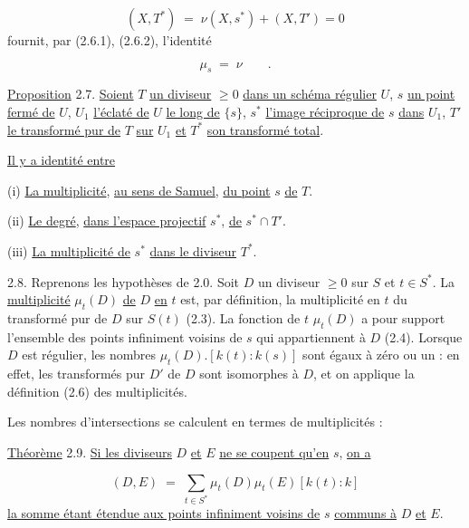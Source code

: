 \begin{equation*}
(X,T^*) \;=\; \nu(X,s^*) + (X,T') = 0
\end{equation*}
fournit, par (2.6.1), (2.6.2), l'identité

\begin{equation}\tag{2.6.3}
\mu_s \;=\; \nu \qquad .
\end{equation}


\underline{Proposition} 2.7. \underline{Soient} $T$ \underline{un diviseur} $\geq 0$ \underline{dans un schéma régulier} $U$, $s$ \underline{un point fermé de} $U$, $U_1$ \underline{l'éclaté de} $U$ \underline{le long de} $\{s\}$, $s^*$ \underline{l'image réciproque de} $s$ \underline{dans} $U_1$, $T'$ \underline{le transformé pur de} $T$ \underline{sur} $U_1$ \underline{et} $T^*$ \underline{son transformé total}.

\underline{Il y a identité entre}

(i) \underline{La multiplicité}, \underline{au sens de Samuel}, \underline{du point} $s$ \underline{de} $T$.

(ii) \underline{Le degré}, \underline{dans l'espace projectif} $s^*$, \underline{de} $s^* \cap T'$.

(iii) \underline{La multiplicité de} $s^*$ \underline{dans le diviseur} $T^*$.

2.8. Reprenons les hypothèses de 2.0. Soit $D$ un diviseur $\geq 0$ sur $S$ et $t \in S^*$. La \underline{multiplicité} $\mu_t(D)$ \underline{de} $D$ \underline{en} $t$ est, par définition, la multiplicité en $t$ du transformé pur de $D$ sur $S(t)$ (2.3). La fonction de $t$ $\mu_t(D)$ a pour support l'ensemble des points infiniment voisins de $s$ qui appartiennent à $D$ (2.4). Lorsque $D$ est régulier, les nombres $\mu_t(D).[k(t) : k(s)]$ sont égaux à zéro ou un : en effet, les transformés pur $D'$ de $D$ sont isomorphes à $D$, et on applique la définition (2.6) des multiplicités.

Les nombres d'intersections se calculent en termes de multiplicités :

\underline{Théorème} 2.9. \underline{Si les diviseurs} $D$ \underline{et} $E$ \underline{ne se coupent qu'en} $s$, \underline{on a}

\begin{equation*}
(D,E) \;=\; \sum_{t \in S^*} \mu_t(D)\mu_t(E)[k(t):k]
\end{equation*}
\underline{la somme étant étendue aux points infiniment voisins de} $s$ \underline{communs à} $D$ \underline{et} $E$.

